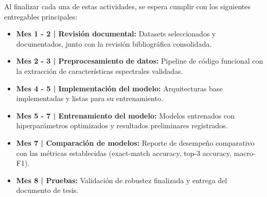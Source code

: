 Al finalizar cada una de estas actividades, se espera cumplir con los siguientes entregables principales:

\begin{itemize}
\item \textbf{Mes 1 - 2 | Revisión documental:} Datasets seleccionados y documentados, junto con la revisión bibliográfica consolidada.
\item \textbf{Mes 2 - 3 | Preprocesamiento de datos:} Pipeline de código funcional con la extracción de características espectrales validadas.
\item \textbf{Mes 4 - 5 | Implementación del modelo:} Arquitecturas base implementadas y listas para su entrenamiento.
\item \textbf{Mes 5 - 7 | Entrenamiento del modelo:} Modelos entrenados con hiperparámetros optimizados y resultados preliminares registrados.
\item \textbf{Mes 7 | Comparación de modelos:} Reporte de desempeño comparativo con las métricas establecidas (exact-match accuracy, top-3 accuracy, macro-F1).
\item \textbf{Mes 8 | Pruebas:} Validación de robustez finalizada y entrega del documento de tesis.
\end{itemize}